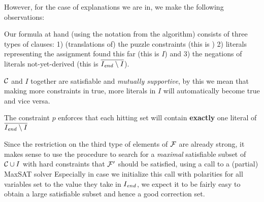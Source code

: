 However, for the case of explanations we are in, we make the following observations: 
\begin{compactitem}
 \item Our formula at hand (using the notation from the \onestep algorithm) consists of three types of clauses: 1) (translations of) the puzzle constraints (this is \formulac) 2) literals representing the assignment found this far (this is $I$) and 3) the negations of literals not-yet-derived (this is $\overline{I_\mathit{end} \setminus I}$). 
 \item $\mathcal{C} $ and $I$ together are satisfiable and \emph{mutually supportive}, by this we mean that making more constraints in \formulac true, more literals in $I$ will automatically become true and vice versa. 
 \item The constraint $p$ enforces that each hitting set will contain \textbf{exactly} one literal of  $\overline{I_\mathit{end} \setminus I}$
\end{compactitem}
Since the restriction on the third type of elements of $\mathcal{F} $ are already strong, it makes sense to use the \grow procedure to search for a \emph{maximal} satisfiable subset of $\mathcal{C} \cup I$ with hard constraints that $\mathcal{F} '$ should be satisfied, using a call to a  (partial) MaxSAT solver Especially in case we initialize this call with  polarities for all variables set to the value they take in $I_\mathit{end} $, we expect it to be fairly easy to obtain a large satisfiable subset and hence a good correction set. 






